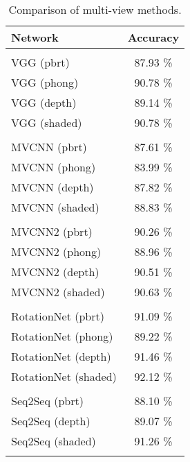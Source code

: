 \begin{table}[]
	\centering
	\begin{tabular}{lc}
		\hline
		\textbf{Network}     & \textbf{Accuracy} \\ \hline
		                     &          \\
		VGG (pbrt)           & 87.93 \% \\
		VGG (phong)         & 90.78 \% \\
		VGG (depth)          & 89.14 \% \\
		VGG (shaded)         & 90.78 \% \\
		                     &          \\
		MVCNN (pbrt)         & 87.61 \% \\
		MVCNN (phong)        & 83.99 \% \\
		MVCNN (depth)        & 87.82 \% \\
		MVCNN (shaded)       & 88.83 \% \\
		                     &          \\
		MVCNN2 (pbrt)        & 90.26 \% \\
		MVCNN2 (phong)       & 88.96 \% \\
		MVCNN2 (depth)       & 90.51 \% \\
		MVCNN2 (shaded)      & 90.63 \% \\
		                     &          \\
		RotationNet (pbrt)   & 91.09 \% \\
		RotationNet (phong)  & 89.22 \% \\
		RotationNet (depth)  & 91.46 \% \\
		RotationNet (shaded) & 92.12 \% \\
		                     &          \\
		Seq2Seq  (pbrt)      & 88.10 \% \\
		Seq2Seq  (depth)     & 89.07 \% \\
		Seq2Seq  (shaded)    & 91.26 \% \\
		                     &          \\ \hline
	\end{tabular}
\caption{Comparison of multi-view methods.}
\label{Table:mv}
\end{table}